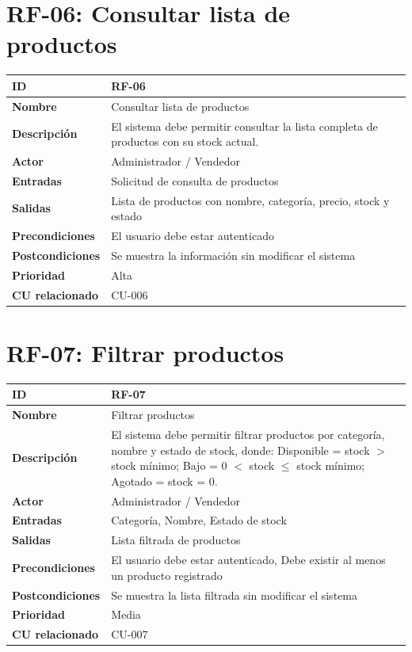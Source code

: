 \documentclass{article}
\begin{document}
\section*{RF-06: Consultar lista de productos}
\begin{center}
\renewcommand{\arraystretch}{1.4}
\begin{tabular}{|L{4cm}|L{12cm}|}
\hline
\textbf{ID} & RF-06 \\
\hline
\textbf{Nombre} & Consultar lista de productos \\
\hline
\textbf{Descripción} & El sistema debe permitir consultar la lista completa de productos con su stock actual. \\
\hline
\textbf{Actor} & Administrador / Vendedor \\
\hline
\textbf{Entradas} & Solicitud de consulta de productos \\
\hline
\textbf{Salidas} & Lista de productos con nombre, categoría, precio, stock y estado \\
\hline
\textbf{Precondiciones} & El usuario debe estar autenticado \\
\hline
\textbf{Postcondiciones} & Se muestra la información sin modificar el sistema \\
\hline
\textbf{Prioridad} & Alta \\
\hline
\textbf{CU relacionado} & CU-006 \\
\hline
\end{tabular}
\end{center}

\section*{RF-07: Filtrar productos}
\begin{center}
\renewcommand{\arraystretch}{1.4}
\begin{tabular}{|L{4cm}|L{12cm}|}
\hline
\textbf{ID} & RF-07 \\
\hline
\textbf{Nombre} & Filtrar productos \\
\hline
\textbf{Descripción} & El sistema debe permitir filtrar productos por categoría, nombre y estado de stock, donde: Disponible = stock $>$ stock mínimo; Bajo = 0 $<$ stock $\leq$ stock mínimo; Agotado = stock = 0. \\
\hline
\textbf{Actor} & Administrador / Vendedor \\
\hline
\textbf{Entradas} & Categoría, Nombre, Estado de stock \\
\hline
\textbf{Salidas} & Lista filtrada de productos \\
\hline
\textbf{Precondiciones} & El usuario debe estar autenticado, Debe existir al menos un producto registrado \\
\hline
\textbf{Postcondiciones} & Se muestra la lista filtrada sin modificar el sistema \\
\hline
\textbf{Prioridad} & Media \\
\hline
\textbf{CU relacionado} & CU-007 \\
\hline
\end{tabular}
\end{center}
\end{document}
